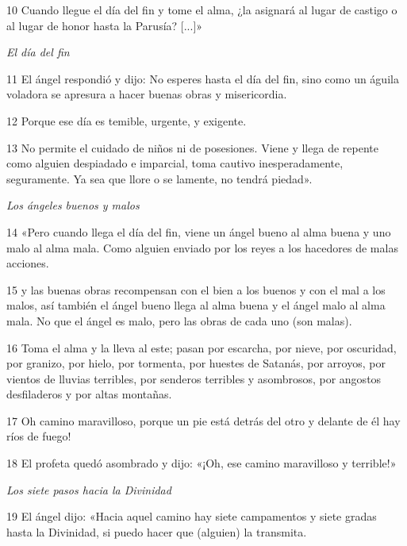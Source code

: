 \par 10 Cuando llegue el día del fin y tome el alma, ¿la asignará al lugar de castigo o al lugar de honor hasta la Parusía? [...]»

\par \textit{El día del fin}

\par 11 El ángel respondió y dijo: No esperes hasta el día del fin, sino como un águila voladora se apresura a hacer buenas obras y misericordia.

\par 12 Porque ese día es temible, urgente, y exigente.

\par 13 No permite el cuidado de niños ni de posesiones. Viene y llega de repente como alguien despiadado e imparcial, toma cautivo inesperadamente, seguramente. Ya sea que llore o se lamente, no tendrá piedad».

\par \textit{Los ángeles buenos y malos}

\par 14 «Pero cuando llega el día del fin, viene un ángel bueno al alma buena y uno malo al alma mala. Como alguien enviado por los reyes a los hacedores de malas acciones.

\par 15 y las buenas obras recompensan con el bien a los buenos y con el mal a los malos, así también el ángel bueno llega al alma buena y el ángel malo al alma mala. No que el ángel es malo, pero las obras de cada uno (son malas).

\par 16 Toma el alma y la lleva al este; pasan por escarcha, por nieve, por oscuridad, por granizo, por hielo, por tormenta, por huestes de Satanás, por arroyos, por vientos de lluvias terribles, por senderos terribles y asombrosos, por angostos desfiladeros y por altas montañas.

\par 17 Oh camino maravilloso, porque un pie está detrás del otro y delante de él hay ríos de fuego!

\par 18 El profeta quedó asombrado y dijo: «¡Oh, ese camino maravilloso y terrible!»

\par \textit{Los siete pasos hacia la Divinidad}

\par 19 El ángel dijo: «Hacia aquel camino hay siete campamentos y siete gradas hasta la Divinidad, si puedo hacer que (alguien) la transmita.

